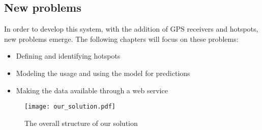 \subsection{New problems} \label{new_problems}
In order to develop this system, with the addition of GPS receivers and hotspots, new problems emerge.
The following chapters will focus on these problems:

\begin{itemize}
\item Defining and identifying hotspots
\item Modeling the usage and using the model for predictions
\item Making the data available through a web service
\end{itemize}

\begin{figure}[h]
\texttt{[image: our\_solution.pdf]}
\caption{The overall structure of our solution}
\label{fig:solution_structure}
\end{figure}
